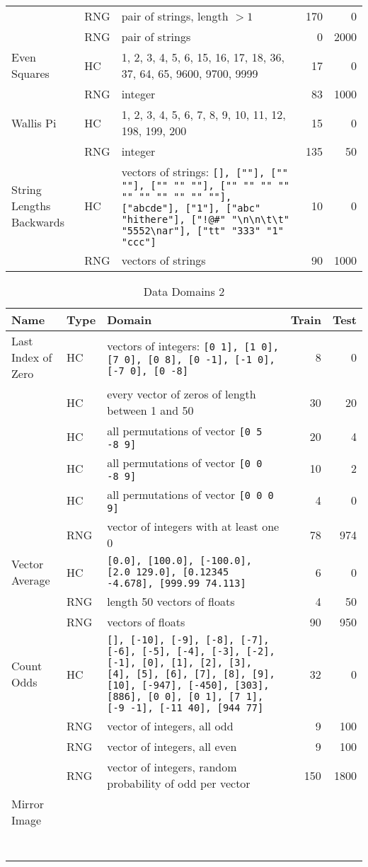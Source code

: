 \documentclass{sig-alternate}
\begin{document}
\begin{table*}
\begin{tabular}{>{\raggedright}p{3.5cm} l >{\raggedright}p{9.8cm} rr}
 & RNG & pair of strings, length $> 1$ & 170 & 0 \tabularnewline
 & RNG & pair of strings & 0 & 2000 \tabularnewline
Even Squares & HC & 1, 2, 3, 4, 5, 6, 15, 16, 17, 18, 36, 37, 64, 65, 9600, 9700, 9999 & 17 & 0 \tabularnewline
 & RNG & integer & 83 & 1000 \tabularnewline
Wallis Pi & HC & 1, 2, 3, 4, 5, 6, 7, 8, 9, 10, 11, 12, 198, 199, 200 & 15 & 0 \tabularnewline
 & RNG & integer & 135 & 50 \tabularnewline
String Lengths Backwards & HC & vectors of strings: \texttt{[], [""], ["" ""], ["" "" ""], ["" "" "" "" "" "" "" "" "" ""], ["abcde"], ["1"], ["abc" "hi\textvisiblespace there"], ["!@\#" "\textbackslash n\textbackslash n\textbackslash t\textbackslash t" "5552\textbackslash na\textvisiblespace r"], ["tt" "333" "1" "ccc"]} & 10 & 0 \tabularnewline
 & RNG & vectors of strings & 90 & 1000 \tabularnewline
\bottomrule
\end{tabular}
\end{table*}

\begin{table*}
\centering
\caption{Data Domains 2}
\label{whatwhat2}
\begin{tabular}{>{\raggedright}p{3.5cm} l >{\raggedright}p{9.8cm} rr}
\toprule
\textbf{Name} & \textbf{Type} & \textbf{Domain} & \textbf{Train} & \textbf{Test} \\
\midrule
Last Index of Zero & HC & vectors of integers: \texttt{[0 1], [1 0], [7 0], [0 8], [0 -1], [-1 0], [-7 0], [0 -8]} & 8 & 0 \tabularnewline
 & HC & every vector of zeros of length between 1 and 50 & 30 & 20 \tabularnewline
 & HC & all permutations of vector \texttt{[0 5 -8 9]} & 20 & 4 \tabularnewline
 & HC & all permutations of vector \texttt{[0 0 -8 9]} & 10 & 2 \tabularnewline
 & HC & all permutations of vector \texttt{[0 0 0 9]} & 4 & 0 \tabularnewline
 & RNG & vector of integers with at least one 0 & 78 & 974 \tabularnewline
Vector Average & HC & \texttt{[0.0], [100.0], [-100.0], [2.0 129.0], [0.12345 -4.678], [999.99 74.113]} & 6 & 0 \tabularnewline
 & RNG & length 50 vectors of floats & 4 & 50 \tabularnewline
 & RNG & vectors of floats & 90 & 950 \tabularnewline
Count Odds & HC & \texttt{[], [-10], [-9], [-8], [-7], [-6], [-5], [-4], [-3], [-2], [-1], [0], [1], [2], [3], [4], [5], [6], [7], [8], [9], [10], [-947], [-450], [303], [886], [0 0], [0 1], [7 1], [-9 -1], [-11 40], [944 77]} & 32 & 0 \tabularnewline
 & RNG & vector of integers, all odd & 9 & 100 \tabularnewline
 & RNG & vector of integers, all even & 9 & 100 \tabularnewline
 & RNG & vector of integers, random probability of odd per vector & 150 & 1800 \tabularnewline
Mirror Image &  &  &  &  \tabularnewline
 &  &  &  &  \tabularnewline
 &  &  &  &  \tabularnewline
 &  &  &  &  \tabularnewline
 &  &  &  &  \tabularnewline
 &  &  &  &  \tabularnewline
 &  &  &  &  \tabularnewline
 &  &  &  &  \tabularnewline
\bottomrule
\end{tabular}
\end{table*}
\end{document}
